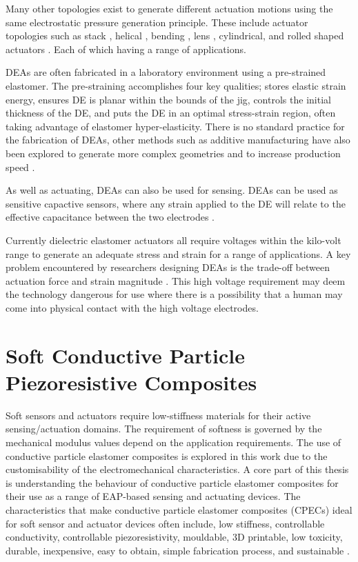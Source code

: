 Many other topologies exist to generate different actuation motions using the same electrostatic pressure generation principle. These include actuator topologies such as stack \citep{Hau2018,Kovacs2009}, helical \citep{Carpi2012}, bending \citep{Pfeil2020}, lens \citep{Ghilardi2019}, cylindrical, and rolled shaped actuators \citep{Amin2018}. Each of which having a range of applications.

DEAs are often fabricated in a laboratory environment using a pre-strained elastomer. The pre-straining accomplishes four key qualities; stores elastic strain energy, ensures DE is planar within the bounds of the jig, controls the initial thickness of the DE, and puts the DE in an optimal stress-strain region, often taking advantage of elastomer hyper-elasticity. There is no standard practice for the fabrication of DEAs, other methods such as additive manufacturing have also been explored to generate more complex geometries and to increase production speed \citep{Park2018,McCoul2017}.

As well as actuating, DEAs can also be used for sensing. DEAs can be used as sensitive capactive sensors, where any strain applied to the DE will relate to the effective capacitance between the two electrodes \citep{Jung2008,Goulbourne2007,Gisby2013}. 

Currently dielectric elastomer actuators all require voltages within the kilo-volt range to generate an adequate stress and strain for a range of applications. A key problem encountered by researchers designing DEAs is the trade-off between actuation force and strain magnitude \citep{Hau2018}. This high voltage requirement may deem the technology dangerous for use where there is a possibility that a human may come into physical contact with the high voltage electrodes.




\section{Soft Conductive Particle Piezoresistive Composites}
\label{sec:Soft Piezoresistive Composites}
Soft sensors and actuators require low-stiffness materials for their active sensing/actuation domains. The requirement of softness is governed by the mechanical modulus values depend on the application requirements. The use of conductive particle elastomer composites is explored in this work due to the customisability of the electromechanical characteristics.
A core part of this thesis is understanding the behaviour of conductive particle elastomer composites for their use as a range of EAP-based sensing and actuating devices. The characteristics that make conductive particle elastomer composites (CPECs) ideal for soft sensor and actuator devices often include, low stiffness, controllable conductivity, controllable piezoresistivity, mouldable, 3D printable, low toxicity, durable, inexpensive, easy to obtain, simple fabrication process, and sustainable \cite{Chung2020,Ge2020,HindermannBischoff2001,Kim2012}.

